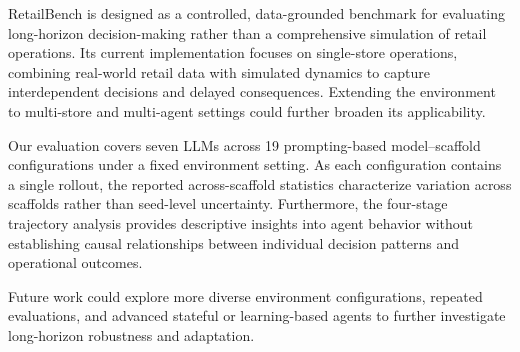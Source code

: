 RetailBench is designed as a controlled, data-grounded benchmark for evaluating long-horizon decision-making rather than a comprehensive simulation of retail operations. Its current implementation focuses on single-store operations, combining real-world retail data with simulated dynamics to capture interdependent decisions and delayed consequences. Extending the environment to multi-store and multi-agent settings could further broaden its applicability.

Our evaluation covers seven LLMs across 19 prompting-based model--scaffold configurations under a fixed environment setting. As each configuration contains a single rollout, the reported across-scaffold statistics characterize variation across scaffolds rather than seed-level uncertainty. Furthermore, the four-stage trajectory analysis provides descriptive insights into agent behavior without establishing causal relationships between individual decision patterns and operational outcomes.

Future work could explore more diverse environment configurations, repeated evaluations, and advanced stateful or learning-based agents to further investigate long-horizon robustness and adaptation.